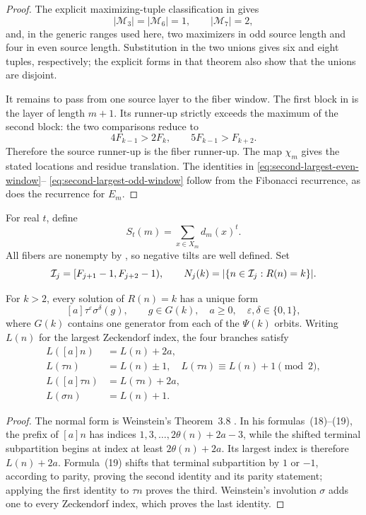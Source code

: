 \begin{proof}
The explicit maximizing-tuple classification in
\cite[Thm.~5.3]{KocabovaMasakovaPelantova2005} gives
\[
 |\mathscr M_3|=|\mathscr M_6|=1,\qquad |\mathscr M_7|=2,
\]
and, in the generic ranges used here, two maximizers in odd source length
and four in even source length.  Substitution in the two unions gives six
and eight tuples, respectively; the explicit forms in that theorem also
show that the unions are disjoint.

It remains to pass from one source layer to the fiber window.  The first
block in  is the layer of length \(m+1\).
Its runner-up strictly exceeds the maximum of the second block: the two
comparisons reduce to
\[
 4F_{k-1}>2F_k,
 \qquad 5F_{k-1}>F_{k+2}.
\]
Therefore the source runner-up is the fiber runner-up.  The map \(\chi_m\)
gives the stated locations and residue translation.  The identities in
\eqref{eq:second-largest-even-window}--
\eqref{eq:second-largest-odd-window} follow from the Fibonacci recurrence,
as does the recurrence for \(E_m\).
\end{proof}

For real \(t\), define
\[
 S_t(m)=\sum_{x\in X_m}d_m(x)^t.
\]
All fibers are nonempty by , so negative
tilts are well defined.  Set
\[
 \mathcal I_j=[F_{j+1}-1,F_{j+2}-1),
 \qquad
 N_j(k)=\lvert \{n\in\mathcal I_j:R(n)=k\} \rvert.
\]

\begin{lemma}
\label{lem:weinstein-orbit-layers}
For \(k>2\), every solution of \(R(n)=k\) has a unique form
\[
 [a]\tau^\varepsilon\sigma^\delta(g),
 \qquad g\in G(k),\quad a\ge0,
 \quad\varepsilon,\delta\in\{0,1\},
\]
where \(G(k)\) contains one generator from each of the \(\Psi(k)\) orbits.
Writing \(L(n)\) for the largest Zeckendorf index, the four branches satisfy
\begin{align}
 L([a]n)&=L(n)+2a, \label{eq:L-a-shift}\\
 L(\tau n)&=L(n)\mathbin{\pm}1,
     \quad L(\tau n)\equiv L(n)+1\pmod2, \label{eq:L-tau-shift}\\
 L([a]\tau n)&=L(\tau n)+2a, \label{eq:L-a-tau-shift}\\
 L(\sigma n)&=L(n)+1. \label{eq:L-sigma-shift}
\end{align}
\end{lemma}

\begin{proof}
The normal form is Weinstein's Theorem~3.8 \cite{Weinstein2016}.  In his
formulas~(18)--(19), the prefix of \([a]n\) has indices
\(1,3,\ldots,2\theta(n)+2a-3\), while the shifted terminal subpartition
begins at index at least \(2\theta(n)+2a\).  Its largest index is therefore
\(L(n)+2a\).  Formula~(19) shifts that terminal subpartition by \(1\) or
\(-1\), according to parity, proving the second identity and its parity
statement; applying the first identity to \(\tau n\) proves the third.
Weinstein's involution \(\sigma\) adds one to every Zeckendorf index, which
proves the last identity.
\end{proof}


